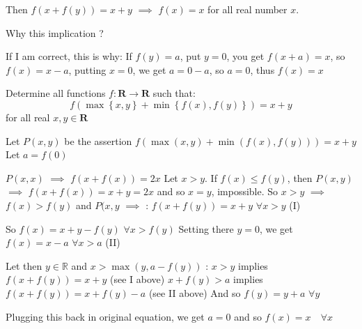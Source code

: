\begin{solution}
	\begin{tcolorbox}Then $f(x+f(y))=x+y$  $\implies$ $f(x)=x$  for all real number $x$.\end{tcolorbox}
Why this implication ?


\end{solution}



\begin{solution}
	If I am correct, this is why:
If $f(y)=a$, put $y=0$, you get $f(x+a)=x$, so $f(x)=x-a$, putting $x=0$, we get $a=0-a$, so $a=0$, thus $f(x)=x$

\end{solution}



\begin{solution}
	\begin{tcolorbox}Determine all functions $f: \mathbf{R} \rightarrow \mathbf{R}$ such that:$$f(\max \left\{ x, y \right\} + \min \left\{ f(x), f(y) \right\}) = x+y $$ for all real $x,y \in \mathbf{R}$\end{tcolorbox}
Let $P(x,y)$ be the assertion $f(\max(x,y)+\min(f(x),f(y)))=x+y$
Let $a=f(0)$

$P(x,x)$ $\implies$ $f(x+f(x))=2x$
Let $x>y$. If $f(x)\le f(y)$, then $P(x,y)$ $\implies$ $f(x+f(x))=x+y=2x$ and so $x=y$, impossible.
So $x>y$ $\implies$ $f(x)>f(y)$ and $P(x,y$ $\implies$ :
$f(x+f(y))=x+y$ $\forall x>y$ (I)

So $f(x)=x+y-f(y)$ $\forall x>f(y)$
Setting there $y=0$, we get 
$f(x)=x-a$ $\forall x>a$ (II)

Let then $y\in\mathbb R$ and $x>\max(y,a-f(y))$ :
$x>y$ implies $f(x+f(y))=x+y$ (see I above)
$x+f(y)>a$ implies $f(x+f(y))=x+f(y)-a$ (see II above)
And so $f(y)=y+a$ $\forall y$

Plugging this back in original equation, we get $a=0$ and so
$\boxed{f(x)=x\quad\forall x}$


\end{solution}






